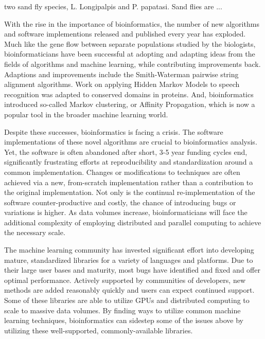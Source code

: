 two sand fly species, L. Longipalpis and P. papatasi. Sand flies are ...

With the rise in the importance of bioinformatics, the number of new algorithms and software implementions released and published every year has exploded.  Much like the gene flow between separate populations studied by the biologists, bioinformaticians have been successful at adopting and adapting ideas from the fields of algorithms and machine learning, while contributing improvements back.  Adaptions and improvements include the Smith-Waterman pairwise string alignment algorithms. Work on applying Hidden Markov Models to speech recognition was adapted to conserved domains in proteins.  And, bioinformatics introduced so-called Markov clustering, or Affinity Propagation, which is now a popular tool in the broader machine learning world.

Despite these successes, bioinformatics is facing a crisis.  The software implementations of these novel algorithms are crucial to bioinformatics analysis.  Yet, the software is often abandoned after short, 3-5 year funding cycles end, significantly frustrating efforts at reproducibility and standardization around a common implementation.  Changes or modifications to techniques are often achieved via a new, from-scratch implementation rather than a contribution to the original implementation.  Not only is the continual re-implementation of the software counter-productive and costly, the chance of introducing bugs or variations is higher.  As data volumes increase, bioinformaticians will face the additional complexity of employing distributed and parallel computing to achieve the necessary scale.

The machine learning community has invested significant effort into developing mature, standardized libraries for a variety of languages and platforms.  Due to their large user bases and maturity, most bugs have identified and fixed and offer optimal performance.  Actively supported by communities of developers, new methods are added reasonably quickly and users can expect continued support.  Some of these libraries are able to utilize GPUs and distributed computing to scale to massive data volumes. By finding ways to utilize common machine learning techniques, bioinformatics can sidestep some of the issues above by utilizing these well-supported, commonly-available libraries.




